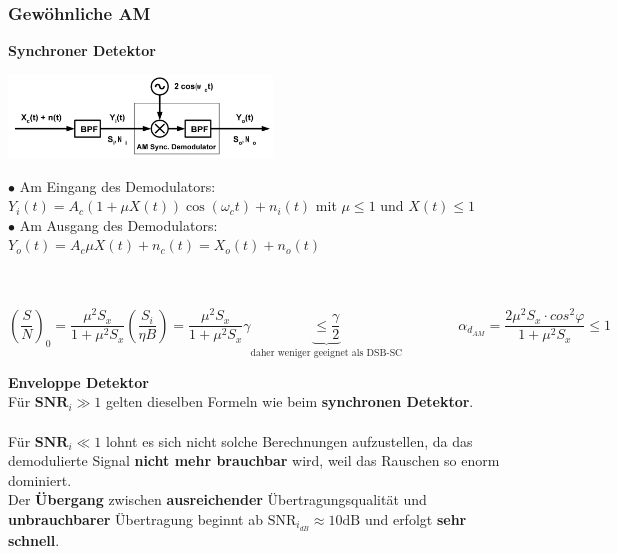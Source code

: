 \subsubsection{Gewöhnliche AM }

\textbf{Synchroner Detektor}\\
\begin{minipage}{7.5cm}
	\includegraphics[width = 7cm]{./bilder/08_Sync_Detektor_AM}
\end{minipage}
\begin{minipage}{11cm}
  $\bullet$ Am Eingang des Demodulators:\\ 
  \hspace*{0.3cm}$Y_i(t) = A_c(1 + \mu X(t)) \cos (\omega_c t) + n_i(t)$ \qquad mit $\mu \leq 1$ und $X(t) \leq 1$\\
  $\bullet$ Am Ausgang des Demodulators:\\ 
  \hspace*{0.3cm} $Y_o(t) = A_c\mu X(t) + n_c(t) = X_o(t) + n_o(t)$
\end{minipage}\\ \\

$$ \left(\dfrac{S}{N}\right)_0 =
\dfrac{\mu^2 S_x}{1 + \mu^2 S_x} \left(\dfrac{S_i}{\eta B}\right) = \dfrac{\mu^2 S_x}{1 + \mu^2
S_x} \gamma \underbrace{\leq \dfrac{\gamma}{2}}_{\text{daher weniger geeignet als DSB-SC}} \qquad \qquad
\alpha_{d_{AM}} = \dfrac{2 \mu^2 S_x \cdot cos^2\varphi}{1 + \mu^2 S_x} \leq 1$$

\textbf{Enveloppe Detektor} \\
Für \boldmath$ \textbf{SNR}_i \gg 1 $ gelten dieselben Formeln wie beim \textbf{synchronen
Detektor}. \\ \\ Für \boldmath$ \textbf{SNR}_i \ll 1 $ lohnt es sich nicht solche
Berechnungen aufzustellen, da das demodulierte Signal \textbf{nicht mehr brauchbar} wird, weil das Rauschen so enorm dominiert. \\
Der \textbf{Übergang} zwischen \textbf{ausreichender} Übertragungsqualität und \textbf{unbrauchbarer}  
Übertragung beginnt ab \unboldmath$ \text{SNR}_{i_{dB}} \approx 10 \text{dB} $ und erfolgt
\textbf{sehr schnell}.

